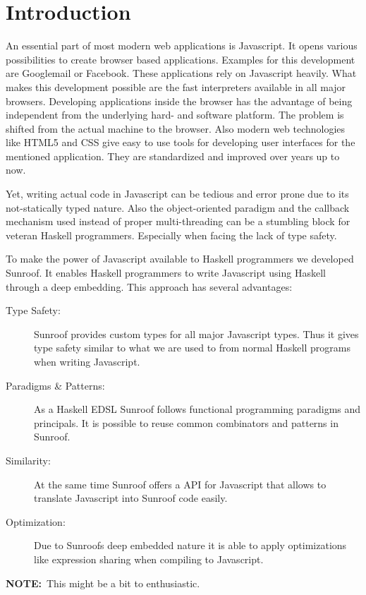 \documentclass{llncs}
\newcommand{\NOTE}[1]{{\Large\textbf{NOTE:}\ #1}}
\begin{document}
\section{Introduction}

An essential part of most modern web applications is Javascript.
It opens various possibilities to create browser based applications.
Examples for this development are Googlemail or Facebook.
These applications rely on Javascript heavily. What makes this 
development possible are the fast interpreters available in all
major browsers. Developing applications inside the browser has
the advantage of being independent from the underlying hard- and
software platform. The problem is shifted from the actual machine
to the browser. Also modern web technologies like HTML5 and CSS
give easy to use tools for developing user interfaces for the
mentioned application. They are standardized and improved over years
up to now. 

Yet, writing actual code in Javascript can be tedious and error prone 
due to its not-statically typed nature. Also the object-oriented
paradigm and the callback mechanism used instead of proper multi-threading 
can be a stumbling block for veteran Haskell programmers. Especially when
facing the lack of type safety.

To make the power of Javascript available to Haskell programmers 
we developed Sunroof. It enables Haskell programmers to write
Javascript using Haskell through a deep embedding. This 
approach has several advantages:

\begin{description}
\item[Type Safety:] Sunroof provides custom types for all major Javascript
types. Thus it gives type safety similar to what we are used to from 
normal Haskell programs when writing Javascript.
\item[Paradigms \& Patterns:] As a Haskell EDSL Sunroof follows functional programming 
paradigms and principals. It is possible to reuse common combinators and 
patterns in Sunroof.
\item[Similarity:] At the same time Sunroof offers a API for Javascript 
that allows to translate Javascript into Sunroof code easily.
\item[Optimization:] Due to Sunroofs deep embedded nature it is able
to apply optimizations like expression sharing when compiling to Javascript.
\end{description}

\NOTE{This might be a bit to enthusiastic.}
\end{document}
